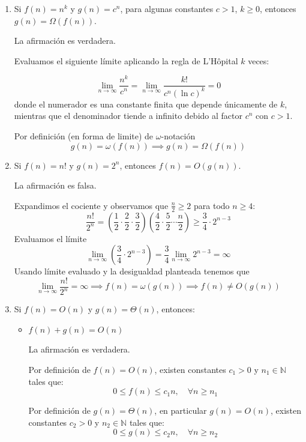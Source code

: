 \begin{enumerate}[label=\arabic*.]
    \item Si $f(n)=n^k$ y $g(n)=c^n$, para algunas constantes $c>1$, $k\ge 0$, entonces $g(n)=\Omega(f(n))$.
    
    La afirmación es verdadera.

    Evaluamos el siguiente límite aplicando la regla de L'Hôpital $k$ veces:
    
    \[
    \lim_{n \to \infty} \frac{n^k}{c^n} = \lim_{n \to \infty} \frac{k!}{c^n (\ln c)^k} = 0
    \]
    donde el numerador es una constante finita que depende únicamente de $k$, mientras que el denominador tiende a infinito debido al factor $c^n$ con $c > 1$. 
    
    Por definición (en forma de limite) de $\omega$-notación 
    \[
    g(n) = \omega (f(n)) \implies g(n) = \Omega(f(n))
    \]

    \item Si $f(n) = n!$ y $g(n) = 2^n$, entonces $f(n)=O(g(n))$.
    
    La afirmación es falsa.

    Expandimos el cociente y observamos que $\frac{n}{2} \ge 2$ para todo $n \ge 4$:
        \[
        \frac{n!}{2^n} = \left(\frac{1}{2} \cdot \frac{2}{2} \cdot \frac{3}{2}\right) \left(\frac{4}{2} \cdot \frac{5}{2} \cdots \frac{n}{2}\right) \ge \frac{3}{4} \cdot 2^{n-3}
        \]
        Evaluamos el límite
        \[
        \lim_{n \to \infty} \left(\frac{3}{4} \cdot 2^{n-3}\right) = \frac{3}{4} \lim_{n \to \infty} 2^{n-3} = \infty
        \]
        Usando límite evaluado y la desigualdad planteada tenemos que
        \[
        \lim_{n \to \infty} \frac{n!}{2^n} = \infty \implies f(n) = \omega(g(n)) \implies f(n) \neq O(g(n))
        \]

    \item Si $f(n) = O(n)$ y $g(n) = \Theta(n)$, entonces:
    \begin{itemize}
        
        \item $f(n) + g(n) = O(n)$

        La afirmación es verdadera.
        
        Por definición de $f(n) = O(n)$, existen constantes $c_1 > 0$ y $n_1 \in \mathbb{N}$ tales que:
        \[
        0 \le f(n) \le c_1 n, \quad \forall n \ge n_1
        \]
        
        Por definición de $g(n) = \Theta(n)$, en particular $g(n) = O(n)$, existen constantes $c_2 > 0$ y $n_2 \in \mathbb{N}$ tales que:
        \[
        0 \le g(n) \le c_2 n, \quad \forall n \ge n_2
        \]
        

\end{itemize}
\end{enumerate}
